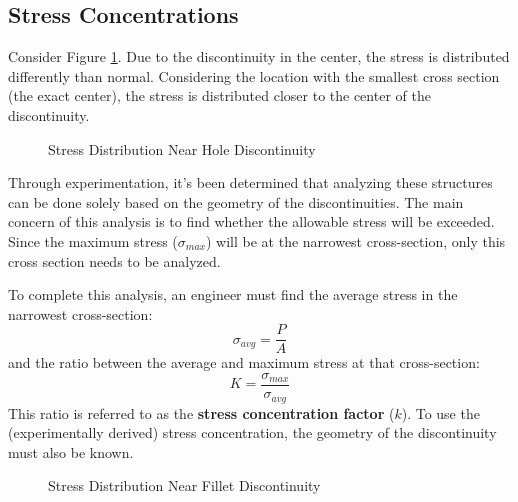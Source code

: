 \documentclass[12pt]{article}
\begin{document}
\subsection{Stress Concentrations}
\label{ssec:axialStressConcentrations}

Consider Figure \ref{fig:stressDistributionNearHoleDiscontinuity}. Due to the discontinuity in the center, the stress is distributed differently than normal. Considering the location with the smallest cross section (the exact center), the stress is distributed closer to the center of the discontinuity.

\begin{figure}[H]
  \centering
  \begin{subfigure}[H]{0.48\textwidth}
    \centering
    
  \end{subfigure}
  \begin{subfigure}[H]{0.48\textwidth}
    \centering
    
  \end{subfigure}
  \caption{Stress Distribution Near Hole Discontinuity}
  \label{fig:stressDistributionNearHoleDiscontinuity}
\end{figure}

Through experimentation, it's been determined that analyzing these structures can be done solely based on the geometry of the discontinuities. The main concern of this analysis is to find whether the allowable stress will be exceeded. Since the maximum stress ($\sigma_{max}$) will be at the narrowest cross-section, only this cross section needs to be analyzed.

To complete this analysis, an engineer must find the average stress in the narrowest cross-section:
\begin{equation*}
  \sigma_{avg} = \frac{P}{A}
\end{equation*}
and the ratio between the average and maximum stress at that cross-section:
\begin{equation*}
  K = \frac{\sigma_{max}}{\sigma_{avg}}
\end{equation*}
This ratio is referred to as the \textbf{stress concentration factor} ($k$). To use the (experimentally derived) stress concentration, the geometry of the discontinuity must also be known.

\begin{figure}[H]
  \centering
  \begin{subfigure}[H]{0.48\textwidth}
    \centering
    
  \end{subfigure}
  \begin{subfigure}[H]{0.48\textwidth}
    \centering
    
  \end{subfigure}
  \caption{Stress Distribution Near Fillet Discontinuity}
  \label{fig:stressDistributionNearFilletDiscontinuity}
\end{figure}
\end{document}
